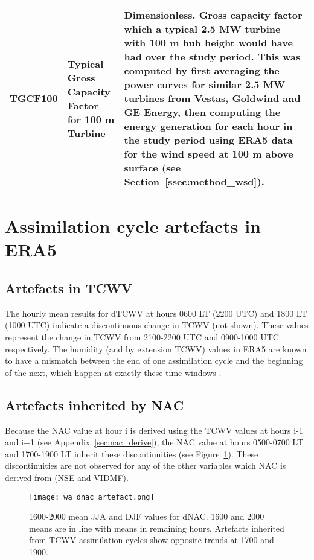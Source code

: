 \begin{landscape}
\begin{longtable}{P{2cm}P{3cm}P{13cm}}
		\acs{TGCF100} & Typical Gross Capacity Factor for 100 m Turbine & Dimensionless. Gross capacity factor which a typical 2.5 MW turbine with 100 m hub height would have had over the study period. This was computed by first averaging the power curves for similar 2.5 MW turbines from Vestas, Goldwind and GE Energy, then computing the energy generation for each hour in the study period using \ac{ERA5} data for the wind speed at 100 m above surface (see Section~\ref{ssec:method_wsd}). \\ \bottomrule
	\end{longtable}
	
	\endgroup
\end{landscape}

\section{Assimilation cycle artefacts in ERA5}
\label{sec:artefact}

\subsection{Artefacts in TCWV}

The hourly mean results for \ac{dTCWV} at hours 0600 \ac{LT} (2200 UTC) and 1800 \ac{LT} (1000 UTC) indicate a discontinuous change in \ac{TCWV} (not shown). These values represent the change in \ac{TCWV} from 2100-2200 UTC and 0900-1000 UTC respectively. The humidity (and by extension \ac{TCWV}) values in ERA5 are known to have a mismatch between the end of one assimilation cycle and the beginning of the next, which happen at exactly these time windows \citep{ecmwf}.

\subsection{Artefacts inherited by NAC}

Because the \ac{NAC} value at hour i is derived using the \ac{TCWV} values at hours i-1 and i+1 (see Appendix~\ref{sec:nac_derive}), the \ac{NAC} value at hours 0500-0700 \ac{LT} and 1700-1900 \ac{LT} inherit these discontinuities (see Figure~\ref{fig:wa_dnac_artefact}). These discontinuities are not observed for any of the other variables which \ac{NAC} is derived from (\ac{NSE} and \ac{VIDMF}).

\begin{figure}[!htp]
	\centering
	\texttt{[image: wa\_dnac\_artefact.png]}
	\caption[1600-2000 means for dNAC (artefacts)]{1600-2000 mean \ac{JJA} and \ac{DJF} values for \acs{dNAC}. 1600 and 2000 means are in line with means in remaining hours. Artefacts inherited from \ac{TCWV} assimilation cycles show opposite trends at 1700 and 1900.}
	\label{fig:wa_dnac_artefact}
\end{figure}

